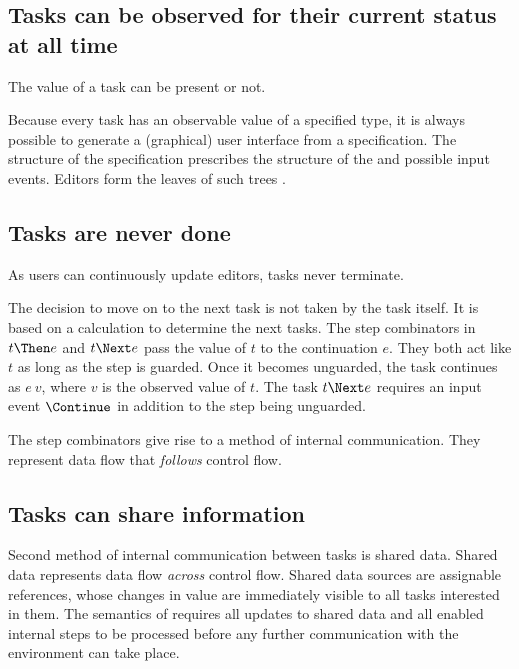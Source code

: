 \subsection{Tasks can be observed for their current status at all time}

The value of a task can be present or not.

Because every task has an observable value of a specified type,
it is always possible to generate a (graphical) user interface from a \TOPHAT specification.
The structure of the specification prescribes the structure of the \UI and possible input events.
Editors form the leaves of such trees .



\subsection{Tasks are never done}

As users can continuously update editors, tasks never terminate.

The decision to move on to the next task is not taken by the task itself.
It is based on a calculation to determine the next tasks.
The step combinators in $t \Then e$ and $t \Next e$ pass the value of $t$ to the continuation $e$.
They both act like $t$ as long as the step is guarded.
Once it becomes unguarded, the task continues as $e\ v$, where $v$ is the observed value of $t$.
The task $t \Next e$ requires an input event $\Continue$ in addition to the step being unguarded. %

The step combinators give rise to a method of internal communication.
They represent data flow that \emph{follows} control flow.




\subsection{Tasks can share information}

Second method of internal communication between tasks is shared data.
Shared data represents data flow \emph{across} control flow.
Shared data sources are assignable references, whose changes in value are immediately visible to all tasks interested in them.
The semantics of \TOPHAT requires all updates to shared data and all enabled internal steps to be processed before any further communication with the environment can take place.


